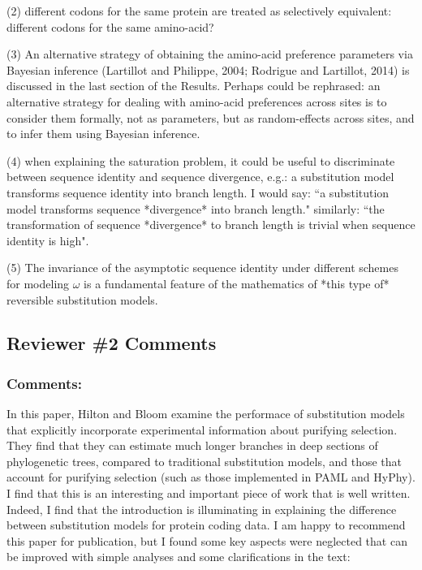 \documentclass[11pt, oneside]{article}   	%
\newcommand{\response}[1]{{\color{black}#1}}
\begin{document}
(2) different codons for the same protein are treated as selectively equivalent: different codons for the same amino-acid? 
\response{}

(3) An alternative strategy of obtaining the amino-acid preference parameters via Bayesian inference (Lartillot and Philippe, 2004; Rodrigue and Lartillot, 2014) is discussed in the last section of the Results. 
Perhaps could be rephrased: an alternative strategy for dealing with amino-acid preferences across sites is to consider them formally, not as parameters, but as random-effects across sites, and to infer them using Bayesian inference.
\response{}

(4) when explaining the saturation problem, it could be useful to discriminate between sequence identity and sequence divergence, e.g.: 
a substitution model transforms sequence identity into branch length. I would say: ``a substitution model transforms sequence *divergence* into branch length." 
similarly: 
``the transformation of sequence *divergence* to branch length is trivial when sequence identity is high". 
\response{}

(5) The invariance of the asymptotic sequence identity under different schemes for modeling $\omega$ is a fundamental feature of the mathematics of *this type of* reversible substitution models. 
\response{}

\subsection*{Reviewer \#2 Comments} 

\subsubsection*{Comments:} 
In this paper, Hilton and Bloom examine the performace of substitution models that explicitly incorporate experimental information about purifying selection. 
They find that they can estimate much longer branches in deep sections of phylogenetic trees, compared to traditional substitution models, and those that account for purifying selection (such as those implemented in PAML and HyPhy). 
I find that this is an interesting and important piece of work that is well written. 
Indeed, I find that the introduction is illuminating in explaining the difference between substitution models for protein coding data. 
I am happy to recommend this paper for publication, but I found some key aspects were neglected that can be improved with simple analyses and some clarifications in the text: 
\response{}
\end{document}
